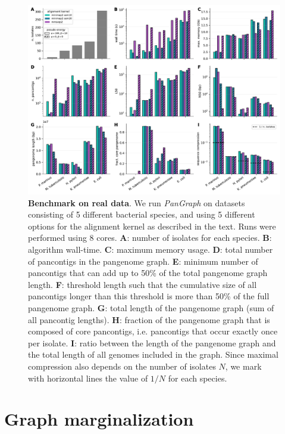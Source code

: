\documentclass[aps,rmp,reprint,superscriptaddress,notitlepage,10pt,onecolumn]{revtex4-1}
\begin{document}
\begin{figure}[htb]
    \includegraphics[width=\textwidth]{figs_suppl/panx_benchmark_suppl.pdf}
    \caption{{\bf Benchmark on real data}. We run \textit{PanGraph} on datasets consisting of 5 different bacterial species, and using 5 different options for the alignment kernel as described in the text. Runs were performed using 8 cores.
        \textbf{A}: number of isolates for each species.
        \textbf{B}: algorithm wall-time.
        \textbf{C}: maximum memory usage.
        \textbf{D}: total number of pancontigs in the pangenome graph.
        \textbf{E}: minimum number of pancontigs that can add up to 50\% of the total pangenome graph length.
        \textbf{F}: threshold length such that the cumulative size of all pancontigs longer than this threshold is more than 50\% of the full pangenome graph.
        \textbf{G}: total length of the pangenome graph (sum of all pancontig lengths).
        \textbf{H}: fraction of the pangenome graph that is composed of core pancontigs, i.e. pancontigs that occur exactly once per isolate.
        \textbf{I}: ratio between the length of the pangenome graph and the total length of all genomes included in the graph. Since maximal compression also depends on the number of isolates $N$, we mark with horizontal lines the value of $1/N$ for each species.
    }
    \label{fig:panx-benchmark-suppl}
\end{figure}


\section{Graph marginalization}
\end{document}
